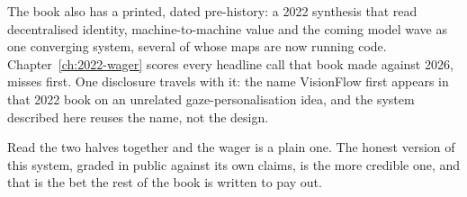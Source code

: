 The book also has a printed, dated pre-history: a 2022 synthesis \parencite{OHare2022Convergence} that read decentralised identity, machine-to-machine value and the coming model wave as one converging system, several of whose maps are now running code. Chapter~\ref{ch:2022-wager} scores every headline call that book made against 2026, misses first. One disclosure travels with it: the name VisionFlow first appears in that 2022 book on an unrelated gaze-personalisation idea, and the system described here reuses the name, not the design.

Read the two halves together and the wager is a plain one. The honest version of this system, graded in public against its own claims, is the more credible one, and that is the bet the rest of the book is written to pay out.
